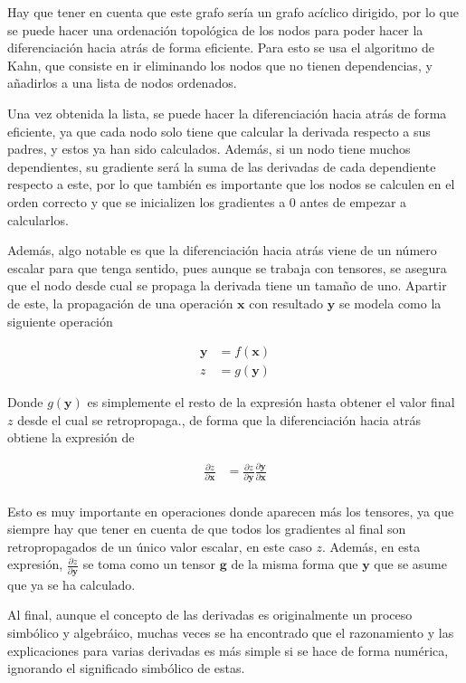 \documentclass{article}
\begin{document}
Hay que tener en cuenta que este grafo sería un grafo acíclico dirigido, por lo que se puede hacer una ordenación topológica de los nodos para poder hacer la diferenciación hacia atrás de forma eficiente.
Para esto se usa el algoritmo de Kahn, que consiste en ir eliminando los nodos que no tienen dependencias, y añadirlos a una lista de nodos ordenados.

Una vez obtenida la lista, se puede hacer la diferenciación hacia atrás de forma eficiente, ya que cada nodo solo tiene que calcular la derivada respecto a sus padres, y estos ya han sido calculados.
Además, si un nodo tiene muchos dependientes, su gradiente será la suma de las derivadas de cada dependiente respecto a este, por lo que también es importante que los nodos se calculen en el orden correcto y que
se inicializen los gradientes a 0 antes de empezar a calcularlos.

Además, algo notable es que la diferenciación hacia atrás viene de un número escalar para que tenga sentido, pues aunque
se trabaja con tensores, se asegura que el nodo desde cual se propaga la derivada tiene un tamaño de uno.
Apartir de este, la propagación de una operación $\bm{x}$ con resultado $\bm{y}$ se modela como la siguiente operación

\begin{align*}
	\bm{y} &= f(\bm{x}) \\
	z &= g(\bm{y})
\end{align*}

Donde $g(\bm{y})$ es simplemente el resto de la expresión hasta obtener el valor final $z$ desde el cual se retropropaga.,
de forma que la diferenciación hacia atrás obtiene la expresión de

\begin{align*}
	\frac{\partial z}{\partial \bm{x}} &= \frac{\partial z}{\partial \bm{y}} \frac{\partial \bm{y}}{\partial \bm{x}} \\
\end{align*}

Esto es muy importante en operaciones donde aparecen más los tensores, ya que siempre hay que tener en cuenta
de que todos los gradientes al final son retropropagados de un único valor escalar, en este caso $z$.
Además, en esta expresión, $\frac{\partial z}{\partial \bm{y}}$ se toma como un tensor $\bm{g}$ de la misma forma que $\bm{y}$
que se asume que ya se ha calculado.

Al final, aunque el concepto de las derivadas es originalmente un proceso simbólico y algebráico, muchas veces
se ha encontrado que el razonamiento y las explicaciones para varias derivadas es más simple si se hace de forma numérica,
ignorando el significado simbólico de estas.
\end{document}
